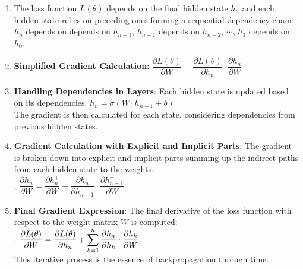 \begin{enumerate}
    \item The loss function $L(\theta)$ depends on the final hidden state $h_n$ and each hidden state relies on preceding ones forming a sequential dependency chain: 
    $h_n$ depends on  depends on $h_{n-1}$, $h_{n-1}$ depends on $h_{n-2}$, $\cdots$, $h_1$ depends on $h_0$.
    \hfill \cite{geeksforgeeks/machine-learning/introduction-to-recurrent-neural-network}

    \item \textbf{Simplified Gradient Calculation}: 
    $
        \dfrac{\partial L(\theta)}{\partial W} = 
        \dfrac{\partial L(\theta)}{\partial h_n} \cdot \dfrac{\partial h_n}{\partial W}
    $
    \hfill \cite{geeksforgeeks/machine-learning/introduction-to-recurrent-neural-network}

    \item \textbf{Handling Dependencies in Layers}: Each hidden state is updated based on its dependencies:
    $
        h_n=\sigma(W\cdot h_{n-1}+b)
    $
    \hfill \cite{geeksforgeeks/machine-learning/introduction-to-recurrent-neural-network}
    \\[0.2cm]
    The gradient is then calculated for each state, considering dependencies from previous hidden states.
    \hfill \cite{geeksforgeeks/machine-learning/introduction-to-recurrent-neural-network}

    \item \textbf{Gradient Calculation with Explicit and Implicit Parts}: The gradient is broken down into explicit and implicit parts summing up the indirect paths from each hidden state to the weights.
    \hfill \cite{geeksforgeeks/machine-learning/introduction-to-recurrent-neural-network}
    \\[0.2cm]
    .\hfill
    $
        \dfrac{\partial h_n}{\partial W}
        = \dfrac{\partial h_n^+}{\partial W} 
        + \dfrac{\partial h_n}{\partial h_{n-1}} \cdot \dfrac{\partial h_{n-1}^+}{\partial W}
    $
    \hfill \cite{geeksforgeeks/machine-learning/introduction-to-recurrent-neural-network}

    \item \textbf{Final Gradient Expression}: The final derivative of the loss function with respect to the weight matrix $W$ is computed:
    \hfill \cite{geeksforgeeks/machine-learning/introduction-to-recurrent-neural-network}
    \\[0.2cm]
    .\hfill
    $
        \dfrac{\partial L(\theta)}{\partial W} 
        = \dfrac{\partial L(\theta)}{\partial h_n}
        + \displaystyle\sum_{k=1}^n \dfrac{\partial h_n}{\partial h_{k}} \cdot \dfrac{\partial h_{k}}{\partial W}
    $
    \hfill \cite{geeksforgeeks/machine-learning/introduction-to-recurrent-neural-network}
    \\[0.2cm]
    This iterative process is the essence of backpropagation through time.
    \hfill \cite{geeksforgeeks/machine-learning/introduction-to-recurrent-neural-network}
\end{enumerate}



